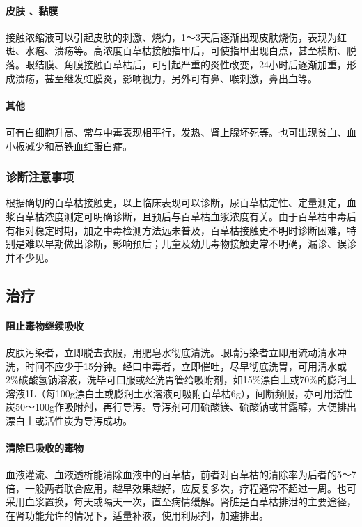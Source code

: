 \paragraph{皮肤 、黏膜}

接触浓缩液可以引起皮肤的刺激、烧灼，1～3天后逐渐出现皮肤烧伤，表现为红斑、水疱、溃疡等。高浓度百草枯接触指甲后，可使指甲出现白点，甚至横断、脱落。眼结膜、角膜接触百草枯后，可引起严重的炎性改变，24小时后逐渐加重，形成溃疡，甚至继发虹膜炎，影响视力，另外可有鼻、喉刺激，鼻出血等。

\paragraph{其他}

可有白细胞升高、常与中毒表现相平行，发热、肾上腺坏死等。也可出现贫血、血小板减少和高铁血红蛋白症。

\subsubsection{诊断注意事项}

根据确切的百草枯接触史，以上临床表现可以诊断，尿百草枯定性、定量测定，血浆百草枯浓度测定可明确诊断，且预后与百草枯血浆浓度有关。由于百草枯中毒后有相对稳定时期，加之中毒检测方法远未普及，百草枯接触史不明时诊断困难，特别是难以早期做出诊断，影响预后；儿童及幼儿毒物接触史常不明确，漏诊、误诊并不少见。

\subsection{治疗}

\paragraph{阻止毒物继续吸收}

皮肤污染者，立即脱去衣服，用肥皂水彻底清洗。眼睛污染者立即用流动清水冲洗，时间不应少于15分钟。经口中毒者，立即催吐，尽早彻底洗胃，可用清水或2\%碳酸氢钠溶液，洗毕可口服或经洗胃管给吸附剂，如15\%漂白土或70\%的膨润土溶液1L（每100g漂白土或膨润土水溶液可吸附百草枯6g），间断频服，亦可用活性炭50～100g作吸附剂，再行导泻。导泻剂可用硫酸镁、硫酸钠或甘露醇，大便排出漂白土或活性炭为导泻成功。

\paragraph{清除已吸收的毒物}

血液灌流、血液透析能清除血液中的百草枯，前者对百草枯的清除率为后者的5～7倍，一般两者联合应用，越早效果越好，应反复多次，疗程通常不超过一周。也可采用血浆置换，每天或隔天一次，直至病情缓解。肾脏是百草枯排泄的主要途径，在肾功能允许的情况下，适量补液，使用利尿剂，加速排出。

